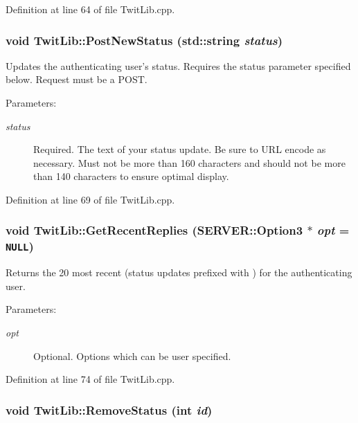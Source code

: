 Definition at line 64 of file TwitLib.cpp.\hypertarget{classTwitLib_971192c761fcd4a7415d2c533b4e5015}{
\subsubsection{\setlength{\rightskip}{0pt plus 5cm}void TwitLib::PostNewStatus (std::string {\em status})}}
\label{classTwitLib_971192c761fcd4a7415d2c533b4e5015}


Updates the authenticating user's status. Requires the status parameter specified below. Request must be a POST. \begin{Desc}
\item[Parameters:]
\begin{description}
\item[{\em status}]Required. The text of your status update. Be sure to URL encode as necessary. Must not be more than 160 characters and should not be more than 140 characters to ensure optimal display. \end{description}
\end{Desc}


Definition at line 69 of file TwitLib.cpp.\hypertarget{classTwitLib_6fe55d138859c38417a124d9a5fd4c27}{
\subsubsection{\setlength{\rightskip}{0pt plus 5cm}void TwitLib::GetRecentReplies ({\bf SERVER::Option3} $\ast$ {\em opt} = {\tt NULL})}}
\label{classTwitLib_6fe55d138859c38417a124d9a5fd4c27}


Returns the 20 most recent  (status updates prefixed with ) for the authenticating user. \begin{Desc}
\item[Parameters:]
\begin{description}
\item[{\em opt}]Optional. Options which can be user specified. \end{description}
\end{Desc}


Definition at line 74 of file TwitLib.cpp.\hypertarget{classTwitLib_2a44ccbe158bcd126a5411f7644120b3}{
\subsubsection{\setlength{\rightskip}{0pt plus 5cm}void TwitLib::RemoveStatus (int {\em id})}}
\label{classTwitLib_2a44ccbe158bcd126a5411f7644120b3}


